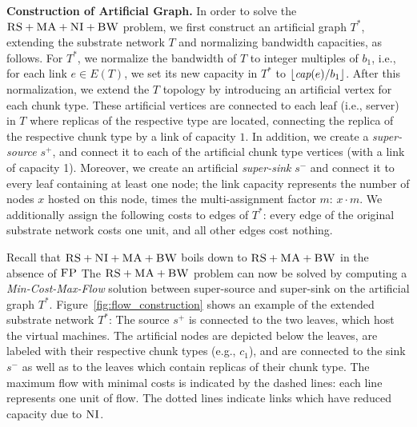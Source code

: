 \documentclass[9pt]{sigcomm-alternate}
\newcommand{\maciek}[1]{\textcolor{brown}{maciek: #1}}
\newcommand{\MaFactor}{m}
\newcommand{\Source}{\ensuremath{s^{+}}}
\newcommand{\Sink}{\ensuremath{s^{-}}}
\newcommand{\achunk}{\ensuremath{c}}
\newcommand{\capacity}{\emph{cap}}
\newcommand{\CC}{\textsc{NI}}
\newcommand{\FP}{\textsc{FP}}
\newcommand{\RS}{\textsc{RS}}
\newcommand{\BW}{\textsc{BW}}
\newcommand{\MA}{\textsc{MA}}
\newcommand{\Tree}{\ensuremath{T}}
\newcommand{\CostTrans}{\ensuremath{b_1}}
\newcommand{\CostCom}{\ensuremath{b_2}}
\begin{document}


\textbf{Construction of Artificial Graph.}
In order to solve the $\RS+\MA+\CC+\BW$ problem,
we first construct
an artificial graph $\Tree^*$, extending the substrate network $\Tree$ and
normalizing bandwidth capacities, as follows. For $\Tree^*$,
we normalize the bandwidth of $\Tree$ to integer multiples of $\CostTrans$,
i.e., for each link $e\in E(\Tree)$, we set its new
capacity in $\Tree^*$ to $\lfloor\capacity(e)/\CostTrans\rfloor$.
After this normalization, we extend the $\Tree$ topology by
introducing an artificial vertex for each chunk type. These artificial
vertices are connected to each leaf (i.e., server) in $\Tree$ where replicas of the respective type are located,
connecting the replica of the respective chunk type by a link of capacity $1$. In
addition, we create a
\emph{super-source} $\Source$, and connect it to each of the artificial chunk
type vertices (with a link of capacity 1). Moreover, we create an artificial \emph{super-sink} $\Sink$ and
connect it to every leaf containing at least one node; the link capacity represents 
the number of nodes $x$ hosted on this node, times the multi-assignment factor 
$\MaFactor$: 
$x \cdot \MaFactor$. 
We additionally assign the following costs to edges of $\Tree^*$:
every edge of the original substrate network costs one unit, and all other edges
cost nothing.

Recall that $\RS+\CC+\MA+\BW$ boils down to
$\RS+\MA+\BW$ in the absence of $\FP$
The $\RS+\MA+\BW$ problem can now be solved by computing
a \emph{Min-Cost-Max-Flow} solution between super-source and super-sink on the artificial graph $\Tree^*$.
Figure~\ref{fig:flow_construction} shows an example of the extended substrate
network $\Tree^*$: The source $\Source$ is connected to the two leaves, which host the
virtual machines. The artificial nodes are depicted below the leaves, are labeled with
their respective chunk types (e.g., $\achunk_1$), and are connected to the sink
$\Sink$ as well as to the leaves which contain replicas of their chunk type.
The
maximum flow with minimal costs is indicated by the dashed lines: each line
represents one unit of flow. The dotted lines indicate links which have reduced
capacity due to $\CC$.
\end{document}
